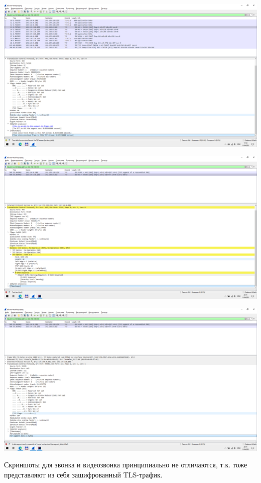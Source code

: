 \begin{center}
    \includegraphics[width=\textwidth]{screenshots/discord_send_4}

    \includegraphics[width=\textwidth]{screenshots/discord_receive_1}

    \includegraphics[width=\textwidth]{screenshots/discord_receive_2}

\end{center}

Скриншоты для звонка и видеозвонка принципиально не отличаются,
т.к. тоже представляют из себя зашифрованный TLS-трафик.

